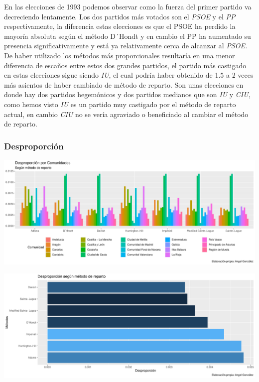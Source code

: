 \documentclass[12pt,a4paper,]{book}
\numberwithin{dummy}{section}
\theoremstyle{ocrenumbox}
\theoremstyle{blacknumex}
\theoremstyle{blacknumbox}
\theoremstyle{ocrenum}
\theoremstyle{ocrenum}
\begin{document}
En las elecciones de 1993 podemos observar como la fuerza del primer
partido va decreciendo lentamente. Los dos partidos más votados son el
\emph{PSOE} y el \emph{PP} respectivamente, la diferencia estas
elecciones es que el PSOE ha perdido la mayoría absoluta según el método
D´Hondt y en cambio el PP ha aumentado su presencia significativamente y
está ya relativamente cerca de alcanzar al \emph{PSOE.} De haber
utilizado los métodos más proporcionales resultaría en una menor
diferencia de escaños entre estos dos grandes partidos, el partido más
castigado en estas elecciones sigue siendo \emph{IU}, el cual podría
haber obtenido de 1.5 a 2 veces más asientos de haber cambiado de método
de reparto. Son unas elecciones en donde hay dos partidos hegemónicos y
dos partidos medianos que son \emph{IU} y \emph{CIU}, como hemos visto
\emph{IU} es un partido muy castigado por el método de reparto actual,
en cambio \emph{CIU} no se vería agraviado o beneficiado al cambiar el
método de reparto.

\hypertarget{desproporciuxf3n-5}{%
\subsubsection{Desproporción}\label{desproporciuxf3n-5}}

\begin{center}\includegraphics[width=0.95\linewidth]{figurasR/unnamed-chunk-105-1} \end{center}

\begin{center}\includegraphics[width=0.95\linewidth]{figurasR/unnamed-chunk-105-2} \end{center}
\end{document}
